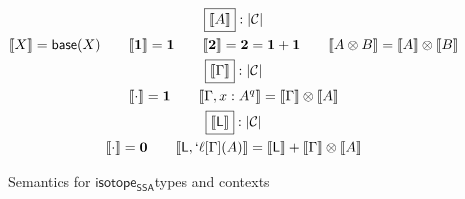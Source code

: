 \documentclass[acmsmall,screen,review]{acmart}
\newcommand{\mc}[1]{\ensuremath{\mathcal{#1}}}
\newcommand{\mb}[1]{\ensuremath{\mathbf{#1}}}
\newcommand{\ms}[1]{\ensuremath{\mathsf{#1}}}
\newcommand{\lbl}[1]{{`#1}}
\newcommand{\thyp}[3]{#1: {#2}^{#3}}
\newcommand{\lhyp}[3]{#1[#2](#3)}
\newcommand{\llhyp}[3]{\lhyp{\lbl{#1}}{#2}{#3}}
\newcommand{\dnt}[1]{\llbracket{#1}\rrbracket}
\newcommand{\isotopessa}{\ms{isotope_{SSA}}}
\begin{document}
\begin{figure}
  \begin{gather*}
    \boxed{\dnt{A}}: |\mc{C}| \\
    \dnt{X} = \ms{base}(X) 
    \qquad
    \dnt{\mb{1}} = \mb{1}
    \qquad
    \dnt{\mb{2}} = \mb{2} = \mb{1} + \mb{1}
    \qquad \dnt{A \otimes B} = \dnt{A} \otimes \dnt{B} \\
    \boxed{\dnt{\Gamma}}: |\mc{C}| \\
    \dnt{\cdot} = \mb{1} \qquad 
    \dnt{\Gamma, \thyp{x}{A}{q}} = \dnt{\Gamma} \otimes \dnt{A} \\
    \boxed{\dnt{\ms{L}}}: |\mc{C}| \\
    \dnt{\cdot} = \mb{0} \qquad
    \dnt{\ms{L}, \llhyp{\ell}{\Gamma}{A}} = 
      \dnt{\ms{L}} + \dnt{\Gamma} \otimes \dnt{A}
  \end{gather*}
  \caption{Semantics for \isotopessa types and contexts}
  \label{fig:ssa-type-semantics}
\end{figure}
\end{document}
